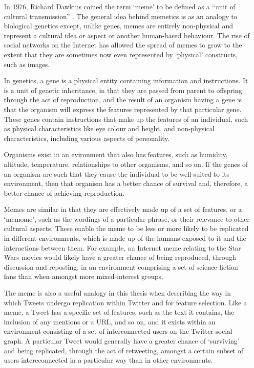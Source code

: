 In 1976, Richard Dawkins coined the term `meme' to be defined as a ``unit of cultural transmission'' \cite{dawkins76}. The general idea behind memetics is as an analogy to biological genetics except, unlike genes, memes are entirely non-physical and represent a cultural idea or aspect or another human-based behaviour. The rise of social networks on the Internet has allowed the spread of memes to grow to the extent that they are sometimes now even represented by `physical' constructs, such as images.

In genetics, a gene is a physical entity containing information and instructions. It is a unit of genetic inheritance, in that they are passed from parent to offspring through the act of reproduction, and the result of an organism having a gene is that the organism will express the features represented by that particular gene. These genes contain instructions that make up the features of an individual, such as physical characteristics like eye colour and height, and non-physical characteristics, including various aspects of personality.

Organisms exist in an evironment that also has features, such as humidity, altitude, temperature, relationships to other organisms, and so on. If the genes of an organism are such that they cause the individual to be well-suited to its environment, then that organism has a better chance of survival and, therefore, a better chance of achieving reproduction.

Memes are similar in that they are effectively made up of a set of features, or a `memome', such as the wordings of a particular phrase, or their relevance to other cultural aspects. These enable the meme to be less or more likely to be replicated in different environments, which is made up of the humans exposed to it and the interactions between them. For example, an Internet meme relating to the Star Wars movies would likely have a greater chance of being reproduced, through discussion and reposting, in an environment comprising a set of science-fiction fans than when amongst more mixed-interest groups.

The meme is also a useful analogy in this thesis when describing the way in which Tweets undergo replication within Twitter and for feature selection. Like a meme, a Tweet has a specific set of features, such as the text it contains, the inclusion of any mentions or a URL, and so on, and it exists within an environment consisting of a set of interconnected users on the Twitter social graph. A particular Tweet would generally have a greater chance of `surviving' and being replicated, through the act of retweeting, amongst a certain subset of users intereconnected in a particular way than in other environments.

